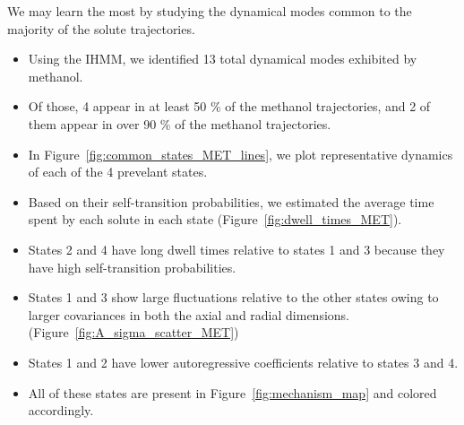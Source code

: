 \documentclass{article}
\begin{document}
  
  We may learn the most by studying the dynamical modes common to the majority of 
  the solute trajectories.
  \begin{itemize}
    \item Using the IHMM, we identified 13 total dynamical modes exhibited by 
    methanol. 
    \item Of those, 4 appear in at least 50 \% of the methanol trajectories, and
    2 of them appear in over 90 \% of the methanol trajectories.
    \item In Figure~\ref{fig:common_states_MET_lines}, we plot representative dynamics
    of each of the 4 prevelant states.
    \item Based on their self-transition probabilities, we estimated the average 
    time spent by each solute in each state (Figure~\ref{fig:dwell_times_MET}).
    \item States 2 and 4 have long dwell times relative to states 1 and 3 because
    they have high self-transition probabilities.
    \item States 1 and 3 show large fluctuations relative to the other states owing
    to larger covariances in both the axial and radial dimensions. (Figure~\ref{fig:A_sigma_scatter_MET})
    \item States 1 and 2 have lower autoregressive coefficients relative to states
    3 and 4.
    \item All of these states are present in Figure~\ref{fig:mechanism_map} and colored
    accordingly.
  \end{itemize} 
  
\end{document}

